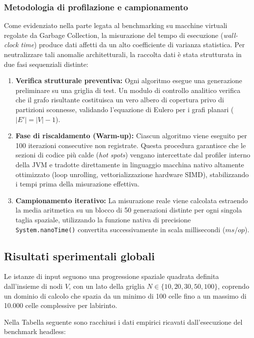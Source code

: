 \documentclass[12pt, a4paper]{article}
\begin{document}
	\subsubsection{Metodologia di profilazione e campionamento}
	Come evidenziato nella parte legata al benchmarking su macchine virtuali regolate da Garbage Collection, la misurazione del tempo di esecuzione (\textit{wall-clock time}) produce dati affetti da un alto coefficiente di varianza statistica. Per neutralizzare tali anomalie architetturali, la raccolta dati è stata strutturata in due fasi sequenziali distinte:
	\begin{enumerate}
		\item \textbf{Verifica strutturale preventiva:} Ogni algoritmo esegue una generazione preliminare su una griglia di test. Un modulo di controllo analitico verifica che il grafo risultante costituisca un vero albero di copertura privo di partizioni sconnesse, validando l'equazione di Eulero per i grafi planari ($|E'| = |V| - 1$).
		\item \textbf{Fase di riscaldamento (Warm-up):} Ciascun algoritmo viene eseguito per 100 iterazioni consecutive non registrate. Questa procedura garantisce che le sezioni di codice più calde (\textit{hot spots}) vengano intercettate dal profiler interno della JVM e tradotte direttamente in linguaggio macchina nativo altamente ottimizzato (loop unrolling, vettorializzazione hardware SIMD), stabilizzando i tempi prima della misurazione effettiva.
		\item \textbf{Campionamento iterativo:} La misurazione reale viene calcolata estraendo la media aritmetica su un blocco di 50 generazioni distinte per ogni singola taglia spaziale, utilizzando la funzione nativa di precisione \texttt{System.nanoTime()} convertita successivamente in scala millisecondi ($ms/op$).
	\end{enumerate}
	
	\subsection{Risultati sperimentali globali}
	Le istanze di input seguono una progressione spaziale quadrata definita dall'insieme di nodi $V$, con un lato della griglia $N \in \{10, 20, 30, 50, 100\}$, coprendo un dominio di calcolo che spazia da un minimo di 100 celle fino a un massimo di 10.000 celle complessive per labirinto.
	
	Nella Tabella seguente sono racchiusi i dati empirici ricavati dall'esecuzione del benchmark headless:
	
\end{document}
